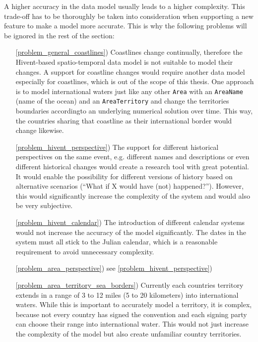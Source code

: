 A higher accuracy in the data model usually leads to a higher complexity. This trade-off has to be thoroughly be taken into consideration when supporting a new feature to make a model more accurate. This is why the following problems will be ignored in the rest of the section:
\begin{itemize}
  \item [\ref{problem_general_coastlines})] Coastlines change continually, therefore the Hivent-based spatio-temporal data model is not suitable to model their changes. A support for coastline changes would require another data model especially for coastlines, which is out of the scope of this thesis. One approach is to model international waters just like any other \texttt{Area} with an \texttt{AreaName} (name of the ocean) and an \texttt{AreaTerritory} and change the territories boundaries accordingto an underlying numerical solution over time. This way, the countries sharing that coastline as their international border would change likewise.
  \item[\ref{problem_hivent_perspective})] The support for different historical perspectives on the same event, e.g. different names and descriptions or even different historical changes would create a research tool with great potential. It would enable the possibility for different versions of history based on alternative scenarios (``What if X would have (not) happened?''). However, this would significantly increase the complexity of the system and would also be very subjective.
  \item[\ref{problem_hivent_calendar})] The introduction of different calendar systems would not increase the accuracy of the model significantly. The dates in the system must all stick to the Julian calendar, which is a reasonable requirement to avoid unnecessary complexity.
  \item[\ref{problem_area_perspective})] see \ref{problem_hivent_perspective})
  \item[\ref{problem_area_territory_sea_borders})] Currently each countries territory extends in a range of 3 to 12 miles (5 to 20 kilometers) \cite{UNSeaBorders} into international waters. While this is important to accurately model a territory, it is complex, because not every country has signed the convention and each signing party can choose their range into international water. This would not just increase the complexity of the model but also create unfamiliar country territories.
\end{itemize}

